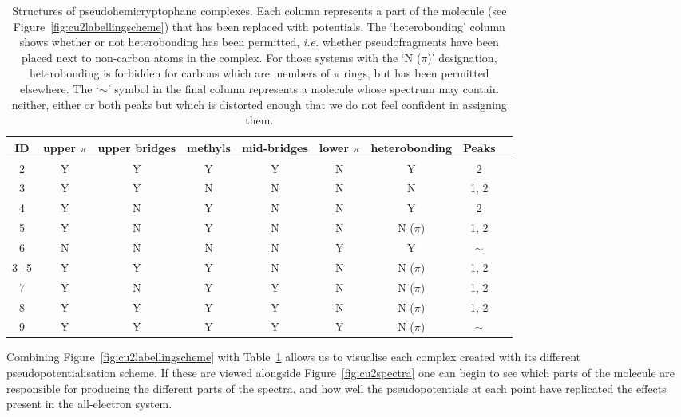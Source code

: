 \documentclass[aip,reprint,nofootinbib]{revtex4-1}
\begin{document}
\begin{table}
\begin{center}
\caption[Breakdown of pseudoCu(II)hemicryptophane structures.]{Structures of pseudohemicryptophane  complexes. Each column represents a part of the molecule (see Figure~\ref{fig:cu2labellingscheme}) that has been replaced with potentials. The `heterobonding' column shows whether or not heterobonding has been permitted, \emph{i.e.} whether pseudofragments have been placed next to non-carbon atoms in the complex. For those systems with the `N ($\pi$)' designation, heterobonding is forbidden for carbons which are members of $\pi$ rings, but has been permitted elsewhere. The `$\sim$' symbol in the final column represents a molecule whose spectrum may contain neither, either or both peaks but which is distorted enough that we do not feel confident in assigning them.}
\label{tab:cu2comppots}
\begin{tabular}{|c|c|c|c|c|c|c|c|c|}
\hline
ID & \multicolumn{1}{m{1cm}|}{\centering upper $\pi$} & \multicolumn{1}{m{1.5cm}|}{\centering upper bridges} & methyls & mid-bridges & \multicolumn{1}{m{1cm}|}{\centering lower $\pi$} & heterobonding & Peaks \\
\hline
2 & Y & Y & Y & Y & N & Y & 2 \\ 
3 & Y & Y & N & N & N & N & 1, 2 \\
4 & Y & N & Y & N & N & Y & 2 \\
5 & Y & N & Y & N & N & N ($\pi$) & 1, 2 \\
6 & N & N & N & N & Y &  Y & $\sim$ \\
3+5 & Y & Y & Y & N & N & N ($\pi$) & 1, 2 \\
7 & Y & N & Y & Y & N & N ($\pi$) & 1, 2 \\
8 & Y & Y & Y & Y & N & N ($\pi$) & 1, 2 \\
9 & Y & Y & Y & Y & Y & N ($\pi$) & $\sim$ \\
\hline
\end{tabular}
\end{center}
\end{table}

Combining Figure~\ref{fig:cu2labellingscheme} with  Table~\ref{tab:cu2comppots} allows us to visualise each complex created with its different pseudopotentialisation scheme. If these are viewed alongside Figure~\ref{fig:cu2spectra} one can begin to see which parts of the molecule are responsible for producing the different parts of the spectra, and how well the pseudopotentials at each point have replicated the effects present in the all-electron system.
\end{document}
